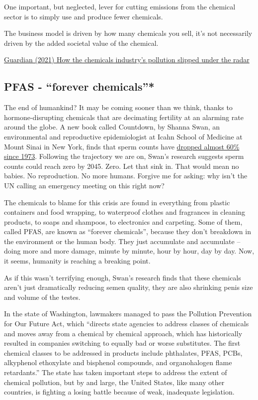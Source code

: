 \documentclass[
]{book}
\begin{document}
One important, but neglected, lever for cutting emissions from the chemical sector is to simply use and produce fewer chemicals.

The business model is driven by how many chemicals you sell, it's not necessarily driven by the added societal value of the chemical.

\href{https://www.theguardian.com/environment/2021/nov/22/chemicals-industry-pollution-emissions-climate}{Guardian (2021) How the chemicals industry's pollution slipped under the radar}

\hypertarget{pfas---forever-chemicals}{%
\subsection{PFAS - ``forever chemicals''*}\label{pfas---forever-chemicals}}

The end of humankind? It may be coming sooner than we think, thanks to hormone-disrupting chemicals that are decimating fertility at an alarming rate around the globe. A new book called Countdown, by Shanna Swan, an environmental and reproductive epidemiologist at Icahn School of Medicine at Mount Sinai in New York, finds that sperm counts have \href{https://www.theguardian.com/us-news/2021/feb/26/falling-sperm-counts-human-survival}{dropped almost 60\% since 1973}. Following the trajectory we are on, Swan's research suggests sperm counts could reach zero by 2045. Zero. Let that sink in. That would mean no babies. No reproduction. No more humans. Forgive me for asking: why isn't the UN calling an emergency meeting on this right now?

The chemicals to blame for this crisis are found in everything from plastic containers and food wrapping, to waterproof clothes and fragrances in cleaning products, to soaps and shampoos, to electronics and carpeting. Some of them, called PFAS, are known as ``forever chemicals'', because they don't breakdown in the environment or the human body. They just accumulate and accumulate -- doing more and more damage, minute by minute, hour by hour, day by day. Now, it seems, humanity is reaching a breaking point.

As if this wasn't terrifying enough, Swan's research finds that these chemicals aren't just dramatically reducing semen quality, they are also shrinking penis size and volume of the testes.

In the state of Washington, lawmakers managed to pass the Pollution Prevention for Our Future Act, which ``directs state agencies to address classes of chemicals and moves away from a chemical by chemical approach, which has historically resulted in companies switching to equally bad or worse substitutes. The first chemical classes to be addressed in products include phthalates, PFAS, PCBs, alkyphenol ethoxylate and bisphenol compounds, and organohalogen flame retardants.'' The state has taken important steps to address the extent of chemical pollution, but by and large, the United States, like many other countries, is fighting a losing battle because of weak, inadequate legislation.
\end{document}
